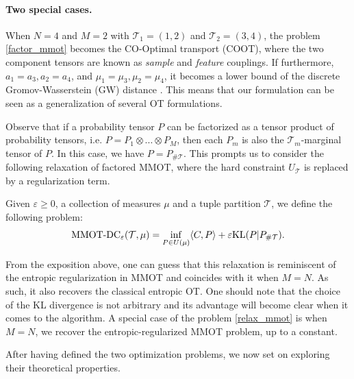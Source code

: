 \paragraph{Two special cases.} When $N = 4$ and $M=2$ with $\mathcal T_1 = (1,2)$ and $\mathcal T_2 = (3,4)$, the problem
\ref{factor_mmot} becomes the CO-Optimal transport (COOT), where the two component tensors are known as
\textit{sample} and \textit{feature} couplings. If furthermore, $a_1 = a_3, a_2=a_4$, and $\mu_1 = \mu_3, \mu_2=\mu_4$, it becomes a
lower bound of the discrete Gromov-Wasserstein (GW) distance \citep{Memoli11}. This means that our formulation can be seen as a
generalization of several OT formulations.

Observe that if a probability tensor $P$ can be factorized as a tensor product of probability tensors, i.e.
$P = P_1 \otimes ... \otimes P_M$, then each $P_m$ is also the $\mathcal T_m$-marginal tensor of $P$. In this case,
we have $P = P_{\# \mathcal T}$. This prompts us to consider the following relaxation of factored MMOT, where the hard constraint
$U_{\mathcal T}$ is replaced by a regularization term.
\begin{definition}
  Given $\varepsilon \geq 0$, a collection of measures $\mu$ and a tuple partition $\mathcal T$,
  we define the following problem:
  \begin{equation} \label{relax_mmot}
    \text{MMOT-DC}_{\varepsilon}( \mathcal T, \mu) =
    \inf_{P \in U(\mu)} \langle C, P \rangle + \varepsilon \text{KL}(P \vert P_{\# \mathcal T}).
  \end{equation}
\end{definition}
From the exposition above, one can guess that this relaxation is reminiscent of the entropic regularization in MMOT and
coincides with it when $M = N$. As such, it also recovers the classical entropic OT. One should note that the choice of the KL
divergence is not arbitrary and its advantage will become clear when it comes to the algorithm. %
A special case of the problem \ref{relax_mmot} is when $M = N$, we recover the entropic-regularized MMOT problem, up to a constant.

After having defined the two optimization problems, we now set on exploring their theoretical properties.


